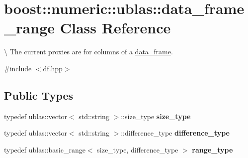 \hypertarget{classboost_1_1numeric_1_1ublas_1_1data__frame__range}{}\section{boost\+:\+:numeric\+:\+:ublas\+:\+:data\+\_\+frame\+\_\+range Class Reference}
\label{classboost_1_1numeric_1_1ublas_1_1data__frame__range}


\textbackslash{} The current proxies are for columns of a \hyperlink{classboost_1_1numeric_1_1ublas_1_1data__frame}{data\+\_\+frame}.  




{\ttfamily \#include $<$df.\+hpp$>$}

\subsection*{Public Types}
\begin{DoxyCompactItemize}
\item 
typedef ublas\+::vector$<$ std\+::string $>$\+::size\+\_\+type {\bfseries size\+\_\+type}\hypertarget{classboost_1_1numeric_1_1ublas_1_1data__frame__range_a96ba76900a3223b6d6eeffcc0a7c800b}{}\label{classboost_1_1numeric_1_1ublas_1_1data__frame__range_a96ba76900a3223b6d6eeffcc0a7c800b}

\item 
typedef ublas\+::vector$<$ std\+::string $>$\+::difference\+\_\+type {\bfseries difference\+\_\+type}\hypertarget{classboost_1_1numeric_1_1ublas_1_1data__frame__range_aea2c29c890553242e21cae65aeda39e1}{}\label{classboost_1_1numeric_1_1ublas_1_1data__frame__range_aea2c29c890553242e21cae65aeda39e1}

\item 
typedef ublas\+::basic\+\_\+range$<$ size\+\_\+type, difference\+\_\+type $>$ {\bfseries range\+\_\+type}\hypertarget{classboost_1_1numeric_1_1ublas_1_1data__frame__range_a4e56278ca0fac0eae88c62f2390b345d}{}\label{classboost_1_1numeric_1_1ublas_1_1data__frame__range_a4e56278ca0fac0eae88c62f2390b345d}

\end{DoxyCompactItemize}
